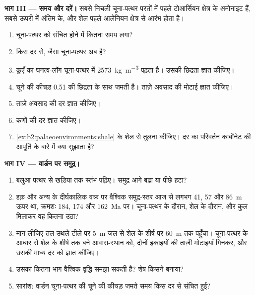 \begin{problem}[{सप्ताहांत समस्या --- वार्डन पहाड़ियों का जुरैसिक समुद्र}]
\medskip\noindent\textbf{भाग III --- समय और दरें।} सबसे निचली चूना-पत्थर परतों में
पहले टोआर्सियन क्षेत्र के अमोनाइट हैं, सबसे ऊपरी में अंतिम के, और शेल
पहले आलेनियन क्षेत्र से आरंभ होता है।
\begin{enumerate}[resume]
  \item चूना-पत्थर को संचित होने में कितना समय लगा?
  \item किस दर से, जैसा चूना-पत्थर अब है?
  \item कुएँ का घनत्व-लॉग चूना-पत्थर में \qty{2573}{kg.m^{-3}} पढ़ता है। उसकी
        छिद्रता ज्ञात कीजिए।
  \item चूने की कीचड़ 0.51 की छिद्रता के साथ जमती है। ताज़े अवसाद की मोटाई ज्ञात कीजिए।
  \item ताज़े अवसाद की दर ज्ञात कीजिए।
  \item कणों की दर ज्ञात कीजिए।
  \item \cref{ex:b2:palaeoenvironments:shale} के शेल से तुलना कीजिए। दर का परिवर्तन
        कार्बोनेट की आपूर्ति के बारे में क्या सुझाता है?
\end{enumerate}

\medskip\noindent\textbf{भाग IV --- वार्डन पर समुद्र।}
\begin{enumerate}[resume]
  \item बलुआ पत्थर से खड़िया तक स्तंभ पढ़िए। समुद्र आगे बढ़ा या पीछे हटा?
  \item हक़ और अन्य के दीर्घकालिक वक्र पर वैश्विक समुद्र-स्तर आज से लगभग 41, 57 और
        \qty{86}{m} ऊपर था, क्रमशः 184, 174 और \qty{162}{Ma} पर। चूना-पत्थर के दौरान, शेल के दौरान,
        और कुल मिलाकर वह कितना उठा?
  \item मान लीजिए तल उथले टीले पर \qty{5}{m} जल से शेल के शीर्ष पर \qty{60}{m} तक पहुँचा।
        चूना-पत्थर के आधार से शेल के शीर्ष तक बने आवास-स्थान को, दोनों इकाइयों की ताज़ी मोटाइयाँ गिनकर,
        और उसकी माध्य दर को ज्ञात कीजिए।
  \item उसका कितना भाग वैश्विक वृद्धि समझा सकती है? शेष किसने बनाया?
  \item सारांश: वार्डन चूना-पत्थर की चूने की कीचड़ जमते समय किस दर से संचित
        हुई?
\end{enumerate}
\end{problem}
